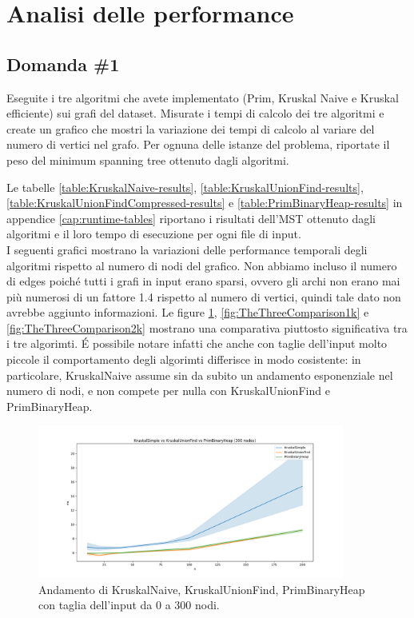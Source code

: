 \section{Analisi delle performance}
\label{cap:performance-analysis}

\subsection{Domanda \#1}

\begin{displayquote}
Eseguite i tre algoritmi che avete implementato (Prim, Kruskal Naive e Kruskal efficiente) sui grafi del dataset. Misurate i tempi di calcolo dei tre algoritmi e create un grafico che mostri la variazione dei tempi di calcolo al variare del numero di vertici nel grafo. Per ognuna delle istanze del problema, riportate il peso del minimum spanning tree ottenuto dagli algoritmi.
\end{displayquote}

\noindent Le tabelle \ref{table:KruskalNaive-results},
 \ref{table:KruskalUnionFind-results}, \ref{table:KruskalUnionFindCompressed-results}
 e \ref{table:PrimBinaryHeap-results} in appendice \ref{cap:runtime-tables} riportano i risultati dell'MST ottenuto dagli algoritmi e il loro tempo di esecuzione per ogni file di input. \\

\noindent I seguenti grafici mostrano la variazioni delle performance temporali degli algoritmi rispetto al numero di nodi del grafico. Non abbiamo incluso il numero di edges poiché tutti i grafi in input erano sparsi, ovvero gli archi non erano mai più numerosi di un fattore 1.4 rispetto al numero di vertici, quindi tale dato non avrebbe aggiunto informazioni. Le figure \ref{fig:TheThreeComparison300}, \ref{fig:TheThreeComparison1k}
e \ref{fig:TheThreeComparison2k} mostrano una comparativa piuttosto significativa tra i tre algorimti.
\'E possibile notare infatti che anche con taglie dell'input molto piccole il comportamento degli
algorimti differisce in modo cosistente: in particolare, KruskalNaive assume sin da subito un
andamento esponenziale nel numero di nodi, e non compete per nulla con KruskalUnionFind e PrimBinaryHeap.

\begin{figure}[H]
    \centering
    \includegraphics[width=0.9\textwidth]{./images/KruskalNaive_vs_KruskalUnionFind_vs_PrimBinaryHeap_(300_nodes).png}
	\caption{Andamento di KruskalNaive, KruskalUnionFind, PrimBinaryHeap con taglia dell'input da 0 a 300 nodi.}
    \label{fig:TheThreeComparison300}
\end{figure}

